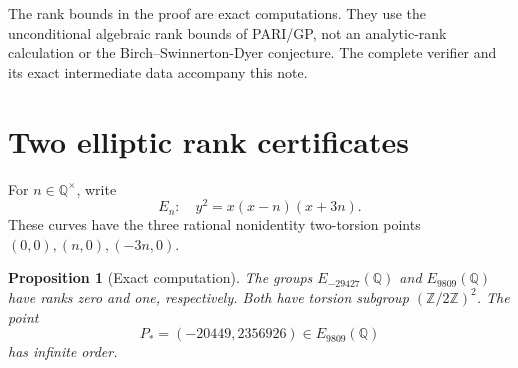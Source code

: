\documentclass[11pt,a4paper]{article}
\newtheorem{proposition}[theorem]{Proposition}
\theoremstyle{definition}\newtheorem{definition}[theorem]{Definition}
\newcommand{\Q}{\mathbb Q}\newcommand{\Z}{\mathbb Z}
\begin{document}
The rank bounds in the proof are exact computations.  They use the
unconditional algebraic rank bounds of PARI/GP, not an analytic-rank
calculation or the Birch--Swinnerton-Dyer conjecture.  The complete
verifier and its exact intermediate data accompany this note.

\section{Two elliptic rank certificates}

For $n\in\Q^\times$, write
\[
                 E_n:\quad y^2=x(x-n)(x+3n).
\]
These curves have the three rational nonidentity two-torsion points
$(0,0),(n,0),(-3n,0)$.

\begin{proposition}[Exact computation]\label{prop:ranks}
The groups $E_{-29427}(\Q)$ and $E_{9809}(\Q)$ have ranks zero
and one, respectively.  Both have torsion subgroup
$(\Z/2\Z)^2$.  The point
\[
                      P_*=(-20449,2356926)\in E_{9809}(\Q)
\]
has infinite order.
\end{proposition}
\end{document}
